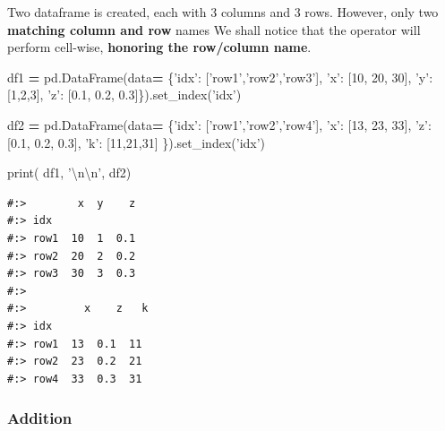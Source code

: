 \documentclass[
]{book}
\newenvironment{Shaded}{\begin{snugshade}}{\end{snugshade}}
\newcommand{\BuiltInTok}[1]{#1}
\newcommand{\CharTok}[1]{\textcolor[rgb]{0.5,0.5,0.5}{#1}}
\newcommand{\DecValTok}[1]{\textcolor[rgb]{0.06,0.06,0.06}{#1}}
\newcommand{\FloatTok}[1]{\textcolor[rgb]{0.06,0.06,0.06}{#1}}
\newcommand{\NormalTok}[1]{#1}
\newcommand{\OperatorTok}[1]{\textcolor[rgb]{0.43,0.43,0.43}{\textbf{#1}}}
\newcommand{\StringTok}[1]{\textcolor[rgb]{0.5,0.5,0.5}{#1}}
\begin{document}
Two dataframe is created, each with 3 columns and 3 rows. However, only two \textbf{matching column and row} names We shall notice that the operator will perform cell-wise, \textbf{honoring the row/column name}.

\begin{Shaded}
\begin{Highlighting}[]
\NormalTok{df1 }\OperatorTok{=}\NormalTok{ pd.DataFrame(data}\OperatorTok{=}
\NormalTok{  \{}\StringTok{'idx'}\NormalTok{: [}\StringTok{'row1'}\NormalTok{,}\StringTok{'row2'}\NormalTok{,}\StringTok{'row3'}\NormalTok{],}
   \StringTok{'x'}\NormalTok{: [}\DecValTok{10}\NormalTok{, }\DecValTok{20}\NormalTok{, }\DecValTok{30}\NormalTok{],}
   \StringTok{'y'}\NormalTok{: [}\DecValTok{1}\NormalTok{,}\DecValTok{2}\NormalTok{,}\DecValTok{3}\NormalTok{],}
   \StringTok{'z'}\NormalTok{: [}\FloatTok{0.1}\NormalTok{, }\FloatTok{0.2}\NormalTok{, }\FloatTok{0.3}\NormalTok{]\}).set_index(}\StringTok{'idx'}\NormalTok{)}
   
\NormalTok{df2 }\OperatorTok{=}\NormalTok{ pd.DataFrame(data}\OperatorTok{=}
\NormalTok{  \{}\StringTok{'idx'}\NormalTok{: [}\StringTok{'row1'}\NormalTok{,}\StringTok{'row2'}\NormalTok{,}\StringTok{'row4'}\NormalTok{],}
   \StringTok{'x'}\NormalTok{: [}\DecValTok{13}\NormalTok{, }\DecValTok{23}\NormalTok{, }\DecValTok{33}\NormalTok{],}
   \StringTok{'z'}\NormalTok{: [}\FloatTok{0.1}\NormalTok{, }\FloatTok{0.2}\NormalTok{, }\FloatTok{0.3}\NormalTok{],}
   \StringTok{'k'}\NormalTok{: [}\DecValTok{11}\NormalTok{,}\DecValTok{21}\NormalTok{,}\DecValTok{31}\NormalTok{]}
\NormalTok{   \}).set_index(}\StringTok{'idx'}\NormalTok{)}
   
\BuiltInTok{print}\NormalTok{( df1, }\StringTok{'}\CharTok{\textbackslash{}n\textbackslash{}n}\StringTok{'}\NormalTok{, df2)}
\end{Highlighting}
\end{Shaded}

\begin{verbatim}
#:>        x  y    z
#:> idx             
#:> row1  10  1  0.1
#:> row2  20  2  0.2
#:> row3  30  3  0.3 
#:> 
#:>         x    z   k
#:> idx              
#:> row1  13  0.1  11
#:> row2  23  0.2  21
#:> row4  33  0.3  31
\end{verbatim}

\hypertarget{addition}{%
\subsubsection{Addition}\label{addition}}
\end{document}
